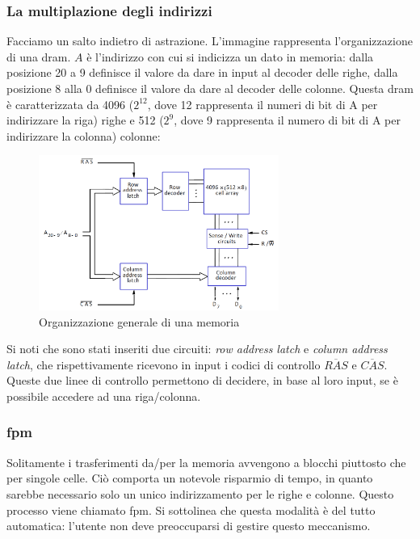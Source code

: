 \documentclass[class=book, crop=false, oneside]{standalone}
\begin{document}
\subsubsection{La multiplazione degli indirizzi}
Facciamo un salto indietro di astrazione. L'immagine rappresenta l'organizzazione di una \acrshort{dram}. \(A\) è l'indirizzo con cui si indicizza un dato in memoria: dalla posizione 20 a 9 definisce il valore da dare in input al decoder delle righe, dalla posizione 8 alla 0 definisce il valore da dare al decoder delle colonne. Questa \acrshort{dram} è caratterizzata da 4096 (\(2^{12}\), dove 12 rappresenta il numeri di bit di A per indirizzare la riga) righe e 512 (\(2^9\), dove 9 rappresenta il numero di bit di A per indirizzare la colonna) colonne:
\begin{figure}[H]
	\centering
	\includegraphics[width=0.7\textwidth,keepaspectratio]{organizzazione_generale.png}
	\caption{Organizzazione generale di una memoria}
\end{figure}
Si noti che sono stati inseriti due circuiti: \emph{row address latch} e \emph{column address latch}, che rispettivamente ricevono in input i codici di controllo \emph{\(\overline{RAS}\)} e \emph{\(\overline{CAS}\)}. Queste due linee di controllo permettono di decidere, in base al loro input, se è possibile accedere ad una riga/colonna.

\subsubsection{\acrfull{fpm}}\label{sec:FPM}
Solitamente i trasferimenti da/per la memoria avvengono a blocchi piuttosto che per singole celle. Ciò comporta un notevole risparmio di tempo, in quanto sarebbe necessario solo un unico indirizzamento per le righe e colonne. Questo processo viene chiamato \acrfull{fpm}. Si sottolinea che questa modalità è del tutto automatica: l'utente non deve preoccuparsi di gestire questo meccanismo.
\end{document}
